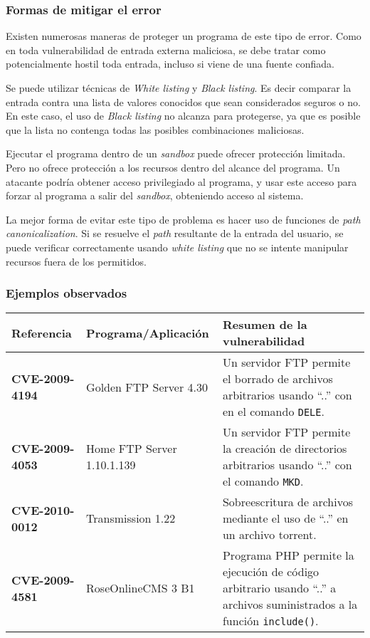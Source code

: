 \subsubsection{Formas de mitigar el error}

Existen numerosas maneras de proteger un programa de este tipo de error.
Como en toda vulnerabilidad de entrada externa maliciosa, se debe tratar como potencialmente hostil toda entrada, incluso si viene de una fuente confiada.

Se puede utilizar técnicas de \textit{White listing} y \textit{Black listing}.
Es decir comparar la entrada contra una lista de valores conocidos que sean considerados seguros o no.
En este caso, el uso de \textit{Black listing} no alcanza para protegerse, ya que es posible que la lista no contenga todas las posibles combinaciones maliciosas.

Ejecutar el programa dentro de un \textit{sandbox} puede ofrecer protección limitada.
Pero no ofrece protección a los recursos dentro del alcance del programa.
Un atacante podría obtener acceso privilegiado al programa, y usar este acceso para forzar al programa a salir del \textit{sandbox}, obteniendo acceso al sistema.

La mejor forma de evitar este tipo de problema es hacer uso de funciones de \textit{path canonicalization}.
Si se resuelve el \textit{path} resultante de la entrada del usuario, se puede verificar correctamente usando \textit{white listing} que no se intente manipular recursos fuera de los permitidos.

\subsubsection{Ejemplos observados}

\begin{tabular}[\baselineskip]{|p{1.75cm}|p{3.5cm}|p{8cm}|}
  \hline
  \textbf{Referencia} & Programa/Aplicación & Resumen de la vulnerabilidad \\
  \hline
  \textbf{CVE-2009-4194} & Golden FTP Server 4.30 & Un servidor FTP permite el borrado de archivos arbitrarios usando ``..'' con en el comando \texttt{DELE}. \\
  \hline
  \textbf{CVE-2009-4053} & Home FTP Server 1.10.1.139 & Un servidor FTP permite la creación de directorios arbitrarios usando ``..'' con el comando \texttt{MKD}.\\
  \hline
  \textbf{CVE-2010-0012} & Transmission 1.22 & Sobreescritura de archivos mediante el
  uso de ``..'' en un archivo torrent. \\
  \hline
  \textbf{CVE-2009-4581} & RoseOnlineCMS 3 B1 & Programa PHP permite la ejecución de código arbitrario usando ``..'' a archivos suministrados a la función \texttt{include()}. \\
  \hline
\end{tabular}
